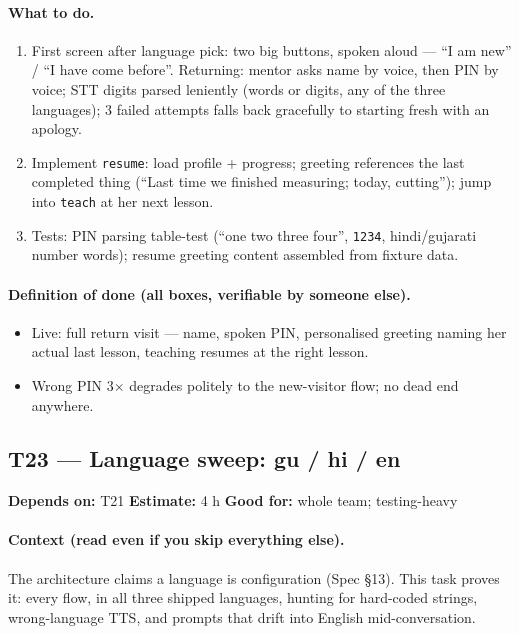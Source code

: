 \documentclass[11pt]{article}
\newcommand{\code}[1]{\texttt{#1}}
\newcommand{\taskmeta}[3]{\noindent\textbf{Depends on:} #1 \quad\textbullet\quad \textbf{Estimate:} #2 \quad\textbullet\quad \textbf{Good for:} #3\par\vspace{2pt}}
\newcommand{\ctx}[1]{\paragraph{Context (read even if you skip everything else).} #1}
\newcommand{\dod}{\paragraph{Definition of done (all boxes, verifiable by someone else).}}
\begin{document}
\paragraph{What to do.}
\begin{enumerate}
  \item First screen after language pick: two big buttons, spoken aloud --- ``I am new'' / ``I have come before''. Returning: mentor asks name by voice, then PIN by voice; STT digits parsed leniently (words or digits, any of the three languages); 3 failed attempts falls back gracefully to starting fresh with an apology.
  \item Implement \code{resume}: load profile + progress; greeting references the last completed thing (``Last time we finished measuring; today, cutting''); jump into \code{teach} at her next lesson.
  \item Tests: PIN parsing table-test (``one two three four'', \code{1234}, hindi/gujarati number words); resume greeting content assembled from fixture data.
\end{enumerate}
\dod
\begin{itemize}
  \item Live: full return visit --- name, spoken PIN, personalised greeting naming her actual last lesson, teaching resumes at the right lesson.
  \item Wrong PIN 3$\times$ degrades politely to the new-visitor flow; no dead end anywhere.
\end{itemize}

\subsection{T23 --- Language sweep: gu / hi / en \dag}
\taskmeta{T21}{4 h}{whole team; testing-heavy}
\ctx{The architecture claims a language is configuration (Spec \S13). This task proves it: every flow, in all three shipped languages, hunting for hard-coded strings, wrong-language TTS, and prompts that drift into English mid-conversation.}
\end{document}
